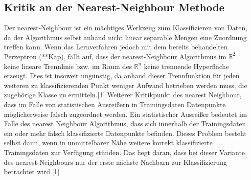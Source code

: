 \documentclass[fontsize=11pt]{scrartcl}
\begin{document}
            \subsection{Kritik an der Nearest-Neighbour Methode}
                Der nearest-Neighbour ist ein mächtiges Werkzeug zum Klassifizieren von Daten, da der Algorithmus selbst anhand nicht linear separable Mengen eine Zuordnung treffen kann. Wenn das Lernverfahren jedoch mit dem bereits behandelten Perzeptron (**Kap), fällt auf, dass der nearest-Neighbour Algorithmus im $\mathbb{R}^2$ keine lineare Trennlinie bzw. im Raum des $\mathbb{R}^n$ keine trennende Hyperfläche erzeugt. Dies ist insoweit ungünstig, da anhand dieser Trennfunktion für jeden weiteren zu klassifizierenden Punkt weniger Aufwand betrieben werden muss, die zugehörige Klasse zu ermitteln.[1] 
                Weiterer Kritikpunkt des nearest Neighbour, dass im Falle von statistischen Ausreißern in Trainingsdaten Datenpunkte möglicherweise falsch zugeordnet werden. Ein statistischer Ausreißer bedeutet im Falle des nearest Neighbour Algorithmus, dass sich innerhalb der Trainingsdaten ein oder mehr falsch klassifizierte Datenpunkte befinden. Dieses Problem besteht selbst dann, wenn in unmittelbarer Nähe weitere korrekt klassifizierte Trainingsdaten zur Verfügung stünden. Das liegt daran, dass bei dieser Variante des nearest-Neighbours nur der erste nächste Nachbarn zur Klassifizierung betrachtet wird.[1]
                         
\end{document}

